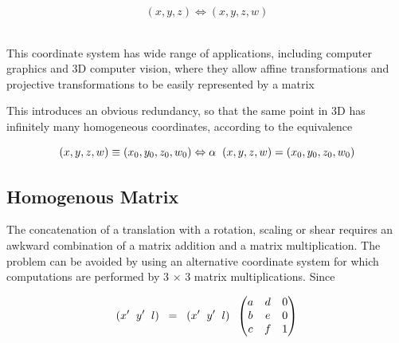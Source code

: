 \documentclass[12pt]{report}
\begin{document}
\begin{center} 
\[ ( x , y , z ) \Leftrightarrow ( x , y , z , w ) \]
\end{center}
\\
\vspace{.3cm}
This coordinate system has wide range of applications, including computer graphics and 3D computer vision, where they allow affine transformations and projective transformations to be easily represented by a matrix
\\
\vspace{.3cm}

This introduces an obvious redundancy, so that the same point in 3D has infinitely many homogeneous coordinates, according to the equivalence
\\
\vspace{.3cm}

\begin{center} 
\[ (x, y, z, w) \equiv (x_{0}, y_{0}, z_{0}, w_{0})   \Leftrightarrow \alpha \hspace{0.2cm} (x, y, z, w) = (x_{0}, y_{0}, z_{0}, w_{0}) \]
\end{center}


\subsection{Homogenous Matrix}

\noindent The concatenation of a translation with a rotation, scaling or shear requires an awkward combination of a matrix addition and a matrix multiplication. The problem can be avoided by using an alternative coordinate system for which computations are performed by 3 × 3 matrix multiplications. Since 

\begin{center}
\[ (x' \hspace{.2cm}  y' \hspace{.2cm}  l )\hspace{.2cm} =\hspace{.2cm} (x' \hspace{.2cm}  y' \hspace{.2cm} l )    \hspace{0.2cm} \begin{pmatrix}
a & d & 0 \\
b & e & 0 \\
c & f & 1 
\end{pmatrix} \]
  
\end{center}
\end{document}
